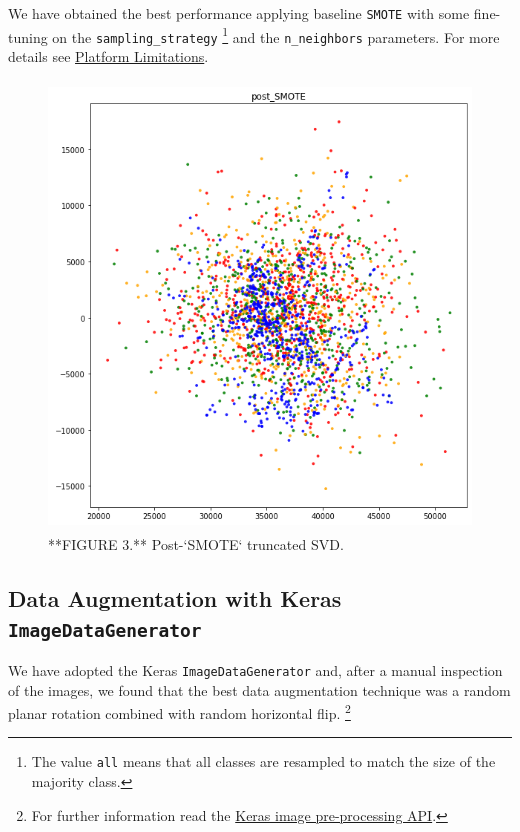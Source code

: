 \documentclass{acm_proc_article-sp}
\begin{document}
We have obtained the best performance applying baseline \texttt{SMOTE}
with some fine-tuning on the \texttt{sampling\_strategy} \footnote{The
  value \texttt{all} means that all classes are resampled to match the
  size of the majority class.} and the \texttt{n\_neighbors} parameters.
For more details see \protect\hyperlink{platform-limitations}{Platform
Limitations}.

\begin{figure}

{\centering \includegraphics[width=450px,height=450]{Images/TruncatedSVD_postSMOTE} 

}

\caption{**FIGURE 3.** Post-`SMOTE` truncated SVD.}\label{fig:post-smote}
\end{figure}

\hypertarget{data-generator}{%
\subsection{\texorpdfstring{Data Augmentation with Keras
\texttt{ImageDataGenerator}}{Data Augmentation with Keras ImageDataGenerator}}\label{data-generator}}

We have adopted the Keras \texttt{ImageDataGenerator} and, after a
manual inspection of the images, we found that the best data
augmentation technique was a random planar rotation combined with random
horizontal flip. \footnote{For further information read the
  \href{https://keras.io/api/preprocessing/image/}{Keras image
  pre-processing API}.}
\end{document}
